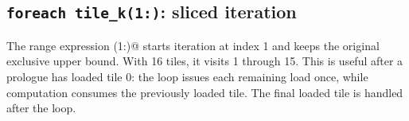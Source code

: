 \subsection*{\texttt{foreach tile\_\allowbreak{}k(1:\allowbreak{})}: sliced iteration}

The range expression \co@(1:)@ starts iteration at index 1 and keeps the original exclusive upper bound. With 16 tiles, it visits 1 through 15. This is useful after a prologue has loaded tile 0: the loop issues each remaining load once, while computation consumes the previously loaded tile. The final loaded tile is handled after the loop.
